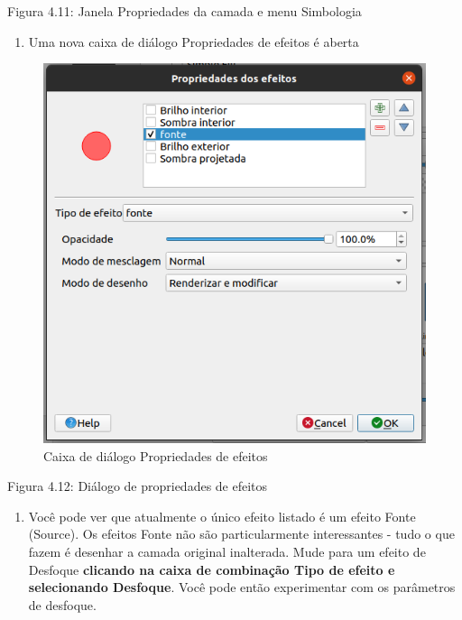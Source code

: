 \documentclass[
  portuguese,
]{krantz}
\providecommand{\tightlist}{%
  \setlength{\itemsep}{0pt}\setlength{\parskip}{0pt}}
\begin{document}
Figura 4.11: Janela Propriedades da camada e menu Simbologia

\begin{enumerate}
\def\labelenumi{\arabic{enumi}.}
\setcounter{enumi}{2}
\tightlist
\item
  Uma nova caixa de diálogo Propriedades de efeitos é aberta
\end{enumerate}

\begin{figure}
\centering
\includegraphics{media/modulo4/new-effects-dialog.png}
\caption{Caixa de diálogo Propriedades de efeitos}
\end{figure}

Figura 4.12: Diálogo de propriedades de efeitos

\begin{enumerate}
\def\labelenumi{\arabic{enumi}.}
\setcounter{enumi}{3}
\tightlist
\item
  Você pode ver que atualmente o único efeito listado é um efeito Fonte (Source). Os efeitos Fonte não são particularmente interessantes - tudo o que fazem é desenhar a camada original inalterada. Mude para um efeito de Desfoque \textbf{clicando na caixa de combinação Tipo de efeito e selecionando Desfoque}. Você pode então experimentar com os parâmetros de desfoque.
\end{enumerate}
\end{document}
